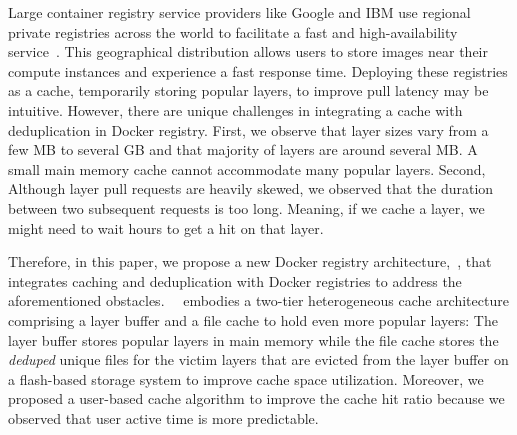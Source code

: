 Large container registry service providers like Google and IBM use regional private registries across the world to facilitate a fast and high-availability service~\cite{xxx}.  
This geographical distribution allows users to store images near their compute instances and experience a fast response time. 
Deploying these registries as a cache, temporarily storing popular layers,
to improve pull latency may be intuitive.
However, there are unique challenges in integrating a cache with deduplication in Docker registry.
First, we observe that layer sizes vary from a few MB to several GB and that majority of layers are around several MB.
A small main memory cache cannot accommodate many popular layers.
Second, 
Although layer pull requests are heavily skewed, we observed that the duration between two subsequent requests is too long. 
Meaning, if we cache a layer, we might need to wait hours to get a hit on that layer.

Therefore, in this paper, we propose a new Docker registry architecture,~\sysname,
that integrates caching and deduplication with Docker registries to address the aforementioned obstacles.
~\sysname~embodies a two-tier heterogeneous cache architecture 
comprising a layer buffer and a file cache to hold even more popular layers:
The layer buffer stores popular layers in main memory while the file cache stores 
the \emph{deduped} unique files for the victim layers that are evicted from the layer buffer on a 
flash-based storage system to improve cache space utilization.
Moreover, we proposed a user-based cache algorithm to improve the cache hit ratio 
because we observed that user active time is more predictable.

